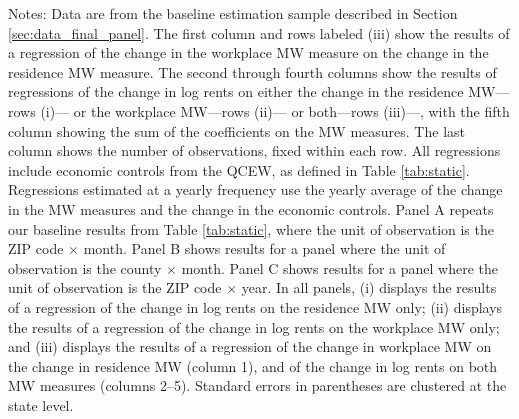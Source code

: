 \begin{landscape}
\begin{table}[ht!]
    \begin{minipage}{.95\linewidth} \footnotesize
        \vspace{2mm}
        Notes:
        Data are from the baseline estimation sample described in Section 
        \ref{sec:data_final_panel}.
        The first column and rows labeled (iii) show the results of a regression 
        of the change in the workplace MW measure on the change in the 
        residence MW measure.
        The second through fourth columns show the results of regressions of the 
        change in log rents on either the change in the residence MW---rows (i)---
        or the workplace MW---rows (ii)--- 
        or both---rows (iii)---, with the fifth column showing the sum of the 
        coefficients on the MW measures.
        The last column shows the number of observations, fixed within each row.
        All regressions include economic controls from the QCEW, as defined in
        Table \ref{tab:static}.
        Regressions estimated at a yearly frequency use the yearly average of
        the change in the MW measures and the change in the economic controls.
        Panel A repeats our baseline results from Table \ref{tab:static}, where 
        the unit of observation is the ZIP code $\times$ month.
        Panel B shows results for a panel where the unit of observation is the 
        county $\times$ month.
        Panel C shows results for a panel where the unit of observation is the 
        ZIP code $\times$ year.
        In all panels,
        (i) displays the results of a regression of the change in log rents on 
        the residence MW only;
        (ii) displays the results of a regression of the change in log 
        rents on the workplace MW only; and
        (iii) displays the results of a regression of the change in workplace
        MW on the change in residence MW (column 1), and of the change in 
        log rents on both MW measures (columns 2--5).
        Standard errors in parentheses are clustered at the state level.
    \end{minipage}
\end{table}
\end{landscape}
